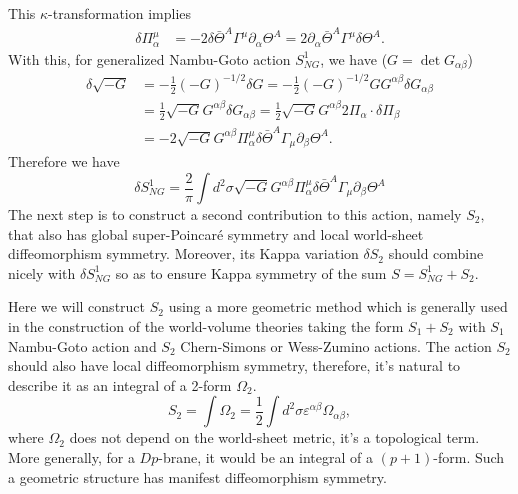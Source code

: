 \documentclass[graybox,envcountchap,sectrefs]{svmono}
\begin{document}
This $\kappa$-transformation implies
\begin{equation}
\begin{aligned}
\delta \Pi_{\alpha}^{\mu}&=-2 \delta \bar{\Theta}^{A} \Gamma^{\mu} \partial_{\alpha} \Theta^{A}=2 \partial_{\alpha} \bar{\Theta}^{A} \Gamma^{\mu} \delta \Theta^{A}.
\end{aligned}
\end{equation}
With this, for generalized Nambu-Goto action $S_{NG}^1$, we have ($G=\det G_{\alpha\beta}$)
\begin{equation}
\begin{aligned}
\delta \sqrt{-G} &=-\frac{1}{2}(-G)^{-1 / 2} \delta G=-\frac{1}{2}(-G)^{-1 / 2} G G^{\alpha \beta} \delta G_{\alpha \beta} \\
&=\frac{1}{2} \sqrt{-G} G^{\alpha \beta} \delta G_{\alpha \beta}=\frac{1}{2} \sqrt{-G} G^{\alpha \beta} 2 \Pi_{\alpha} \cdot \delta \Pi_{\beta} \\
&=-2 \sqrt{-G} G^{\alpha \beta} \Pi_{\alpha}^{\mu} \delta \bar{\Theta}^{A} \Gamma_{\mu} \partial_{\beta} \Theta^{A}.
\end{aligned}
\end{equation}
Therefore we have
\begin{equation}
\delta S_{NG}^1=\frac{2}{\pi} \int d^{2} \sigma \sqrt{-G} G^{\alpha \beta} \Pi_{\alpha}^{\mu} \delta \bar{\Theta}^{A} \Gamma_{\mu} \partial_{\beta} \Theta^{A}
\end{equation}
The next step is to construct a second contribution to this action, namely $S_{2},$ that also has global super-Poincar\'{e} symmetry and local world-sheet diffeomorphism symmetry. Moreover, its Kappa variation $\delta S_{2}$ should combine nicely with $\delta S_{NG}^1$ so as to ensure Kappa symmetry of the sum $S=S_{NG}^1+S_2$.


Here we will construct $S_2$ using a more geometric method which is generally used in the construction of the world-volume theories taking the form $S_1+S_2$ with $S_1$ Nambu-Goto action and $S_2$ Chern-Simons or Wess-Zumino actions.
The action $S_2$ should also have local diffeomorphism symmetry, therefore, it's natural to describe it as an integral of a 2-form $\Omega_2$.
\begin{equation}
S_2=\int \Omega_2=\frac{1}{2}\int d^2 \sigma \varepsilon^{\alpha\beta}\Omega_{\alpha\beta},	
\end{equation}
where $\Omega_{2}$ does not depend on the world-sheet metric, it's a topological term. More generally, for a $Dp$-brane, it would be an integral of a $(p+1)$-form. Such a geometric structure has manifest diffeomorphism symmetry.
\end{document}
